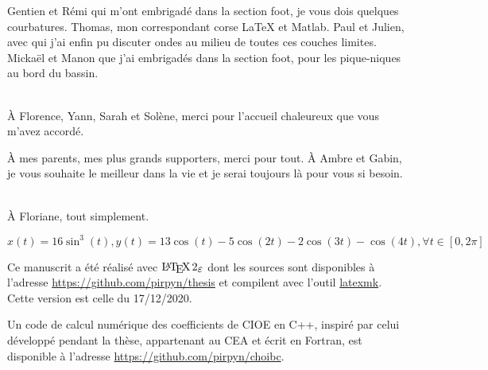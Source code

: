 Gentien et Rémi qui m'ont embrigadé dans la section foot, je vous dois quelques courbatures.
Thomas, mon correspondant corse LaTeX et Matlab.
Paul et Julien, avec qui j'ai enfin pu discuter ondes au milieu de toutes ces couches limites.
Mickaël et Manon que j'ai embrigadés dans la section foot, pour les pique-niques au bord du bassin.

~{}\\

À Florence, Yann, Sarah et Solène, merci pour l'accueil chaleureux que vous m'avez accordé.

À mes parents, mes plus grands supporters, merci pour tout. À Ambre et Gabin, je vous souhaite le meilleur dans la vie et je serai toujours là pour vous si besoin.

~{}\\

À Floriane, tout simplement.

\href{https://www.wolframalpha.com/input/?i=parametric+plot+x+\%3D+16+sin\%5E3+t\%2C+y+\%3D+13+cos+t+-+5+cos\%282+t\%29+-+2+cos+\%28+3+t+\%29+-cos\%284t\%29}{\(x(t) = 16 \sin^3(t), y(t) = 13 \cos(t) - 5 \cos(2 t) - 2 \cos ( 3 t ) - \cos(4t), \forall t \in [0,2\pi]\)}


Ce manuscrit a été réalisé avec \(\LaTeXe\) dont les sources sont disponibles à l'adresse \url{https://github.com/pirpyn/thesis} et compilent avec l'outil \href{https://mg.readthedocs.io/latexmk.html}{latexmk}. 
Cette version est celle du 17/12/2020.

Un code de calcul numérique des coefficients de CIOE en C++, inspiré par celui développé pendant la thèse, appartenant au CEA et écrit en Fortran, est disponible à l'adresse \url{https://github.com/pirpyn/choibc}.

